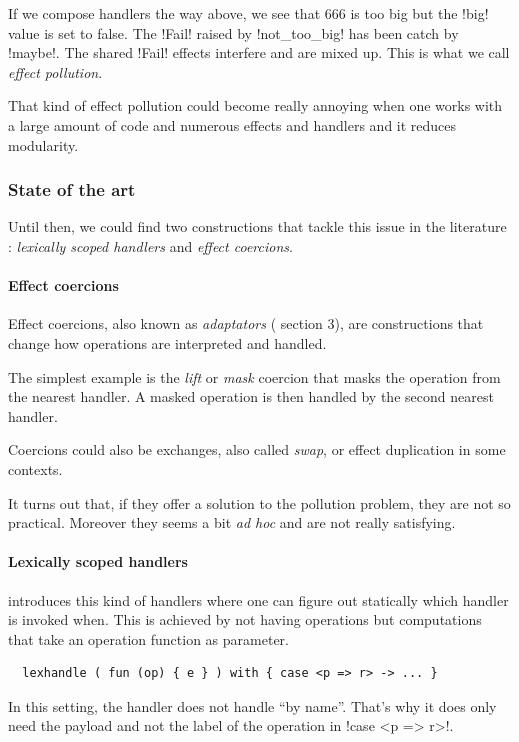 \documentclass[10pt, nonacm=true, language=french, language=english]{acmart}
\begin{document}
If we compose handlers the way above, we see that 666 is too big but the !big! value is set to false. The !Fail! raised by !not_too_big! has been catch by !maybe!. The shared !Fail! effects interfere and are mixed up. This is what we call \emph{effect pollution}.

That kind of effect pollution could become really annoying when one works with a large amount of code and numerous effects and handlers and it reduces modularity.

\subsubsection{State of the art}
\label{sec:state-art}

Until then, we could find two constructions that tackle this issue in the literature : \emph{lexically scoped handlers} and \emph{effect coercions}.

\paragraph{Effect coercions}
Effect coercions, also known as \emph{adaptators} (\citep{doobeedoo} section 3), are constructions that change how operations are interpreted and handled.

The simplest example is the \emph{lift} or \emph{mask} coercion that masks the operation from the nearest handler. A masked operation is then handled by the second nearest handler.

Coercions could also be exchanges, also called \emph{swap}, or effect duplication in some contexts.

It turns out that, if they offer a solution to the pollution problem, they are not so practical. Moreover they seems a bit \emph{ad hoc} and are not really satisfying.

\paragraph{Lexically scoped handlers}
\cite{lex-eff} introduces this kind of handlers where one can figure out statically which handler is invoked when. This is achieved by not having operations but computations that take an operation function as parameter.
\begin{lstlisting}
  lexhandle ( fun (op) { e } ) with { case <p => r> -> ... }
\end{lstlisting}
\begin{rem}
  In this setting, the handler does not handle ``by name''. That's why it does only need the payload and not the label of the operation in !case <p => r>!.
\end{rem}
\end{document}
